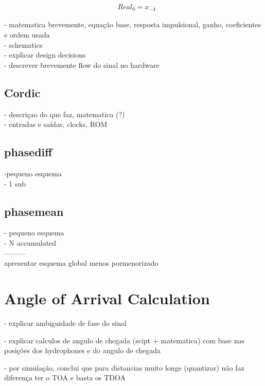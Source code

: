 \begin{eqnarray}
&Real_0 = x_{-4} 
\label{eq:hilbert_reeq}
\end{eqnarray}

- matematica brevemente, equação base, resposta impulsional, ganho, coeficientes e ordem usada
\\
- schematics 
\\
- explicar design decisions
\\
- descrever brevemente flow do sinal no hardware

\subsection{Cordic}
- descriçao do que faz, matematica (?)
\\
- entradas e saídas, clocks, ROM

\subsection{phasediff}
-pequeno esquema 
\\
- 1 sub

\subsection{phasemean}
- pequeno esquema
\\
- N accumulated
\\
---------
\\
apresentar esquema global menos pormenorizado

\section{Angle of Arrival Calculation}

- explicar ambiguidade de fase do sinal

- explicar calculos de angulo de chegada (scipt + matematica) com base nas posições dos hydrophones e do angulo de chegada

- por simulação, conclui que para distancias muito longe (quantizar) não faz diferença ter o TOA e basta os TDOA

